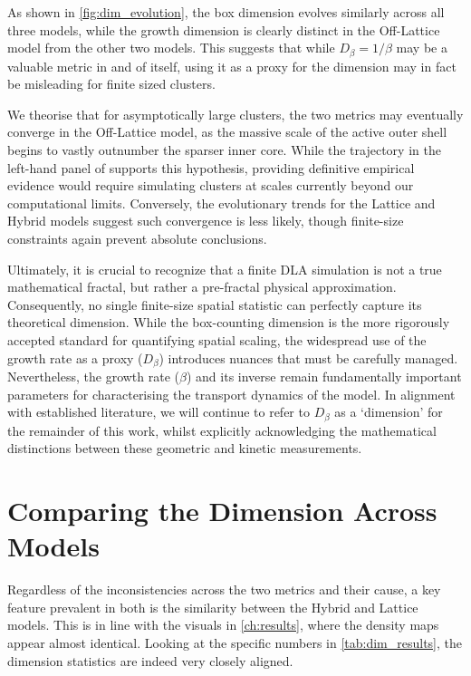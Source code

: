 \documentclass[12pt, a4paper, oneside]{report}
\theoremstyle{remark}
\begin{document}
As shown in \cref{fig:dim_evolution}, the box dimension evolves similarly across all three models, while the growth dimension is clearly distinct in the Off-Lattice model from the other two models. 
This suggests that while $D_{\beta}=1/\beta$ may be a valuable metric in and of itself, using it as a proxy for the dimension may in fact be misleading for finite sized clusters. 

We theorise that for asymptotically large clusters, the two metrics may eventually converge in the Off-Lattice model, as the massive scale of the active outer shell begins to vastly outnumber the sparser inner core. While the trajectory in the left-hand panel of  supports this hypothesis, providing definitive empirical evidence would require simulating clusters at scales currently beyond our computational limits. 
Conversely, the evolutionary trends for the Lattice and Hybrid models suggest such convergence is less likely, though finite-size constraints again prevent absolute conclusions.

Ultimately, it is crucial to recognize that a finite DLA simulation is not a true mathematical fractal, but rather a pre-fractal physical approximation. Consequently, no single finite-size spatial statistic can perfectly capture its theoretical dimension. While the box-counting dimension is the more rigorously accepted standard for quantifying spatial scaling, the widespread use of the growth rate as a proxy ($D_\beta$) introduces nuances that must be carefully managed. Nevertheless, the growth rate ($\beta$) and its inverse remain fundamentally important parameters for characterising the transport dynamics of the model. In alignment with established literature, we will continue to refer to $D_\beta$ as a `dimension' for the remainder of this work, whilst explicitly acknowledging the mathematical distinctions between these geometric and kinetic measurements.

\section{Comparing the Dimension Across Models}
\label{sec:dim_model_comparison}
Regardless of the inconsistencies across the two metrics and their cause, a key feature prevalent in both is the similarity between the Hybrid and Lattice models. This is in line with the visuals in \cref{ch:results}, where the density maps appear almost identical. Looking at the specific numbers in \cref{tab:dim_results}, the dimension statistics are indeed very closely aligned.
\end{document}
